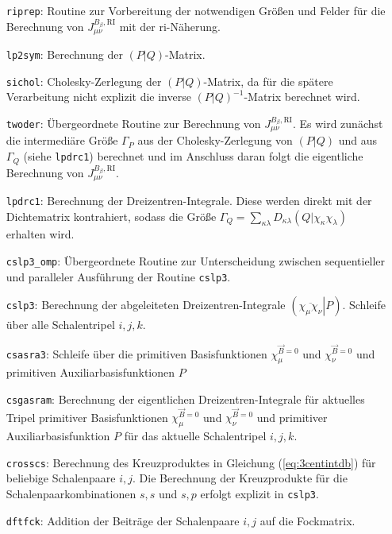 	\begin{itemize}[leftmargin=65pt]
	    \item[\texttt{riprep}:] Routine zur Vorbereitung der notwendigen Größen und Felder für die Berechnung von $J_{\mu\nu}^{B_\beta ,\textrm{RI}}$ mit der \ac{ri}-Näherung. 
	    \item[\texttt{lp2sym}:] Berechnung der $\left(P\vert Q\right)$-Matrix.
	    \item[\texttt{sichol}:] Cholesky-Zerlegung der $\left(P\vert Q\right)$-Matrix, da für die spätere Verarbeitung nicht explizit die inverse $\left(P\vert Q\right)^{-1}$-Matrix berechnet wird.
	    \item[\texttt{twoder}:] Übergeordnete Routine zur Berechnung von $J_{\mu\nu}^{B_\beta ,\textrm{RI}}$. Es wird zunächst die intermediäre Größe $\Gamma_P$ aus der Cholesky-Zerlegung von $\left(P\vert Q\right)$ und aus $\Gamma_Q$ (siehe \texttt{lpdrc1}) berechnet und im Anschluss daran folgt die eigentliche Berechnung von $J_{\mu\nu}^{B_\beta ,\textrm{RI}}$.
	    \item[\texttt{lpdrc1}:] Berechnung der Dreizentren-Integrale. Diese werden direkt mit der Dichtematrix kontrahiert, sodass die Größe $\Gamma_Q=\sum_{\kappa\lambda}D_{\kappa\lambda}\left(Q\vert\chi_\kappa\chi_\lambda\right)$ erhalten wird.
	    \item[\texttt{cslp3\_omp}:] Übergeordnete Routine zur Unterscheidung zwischen sequentieller und paralleler Ausführung der Routine \texttt{cslp3}.
	    \item[\texttt{cslp3}:] Berechnung der abgeleiteten Dreizentren-Integrale $\left(\left.\overline{\chi_\mu\chi_\nu}\right\vert P\right)$. Schleife über alle Schalentripel $i,j,k$.
	    \item[\texttt{csasra3}:] Schleife über die primitiven Basisfunktionen $\chi_\mu^{\vec{B}=0}$ und $\chi_\nu^{\vec{B}=0}$ und primitiven Auxiliarbasisfunktionen $P$
	    \item[\texttt{csgasram}:] Berechnung der eigentlichen Dreizentren-Integrale für aktuelles Tripel primitiver Basisfunktionen $\chi_\mu^{\vec{B}=0}$ und $\chi_\nu^{\vec{B}=0}$ und primitiver Auxiliarbasisfunktion $P$ für das aktuelle Schalentripel $i,j,k$.
	    \item[\texttt{crosscs}:] Berechnung des Kreuzproduktes in Gleichung (\ref{eq:3centintdb}) für beliebige Schalenpaare $i,j$. Die Berechnung der Kreuzprodukte für die Schalenpaarkombinationen $s,s$ und $s,p$ erfolgt explizit in \texttt{cslp3}.
	    \item[\texttt{dftfck}:] Addition der Beiträge der Schalenpaare $i,j$ auf die Fockmatrix.
	\end{itemize}
	
